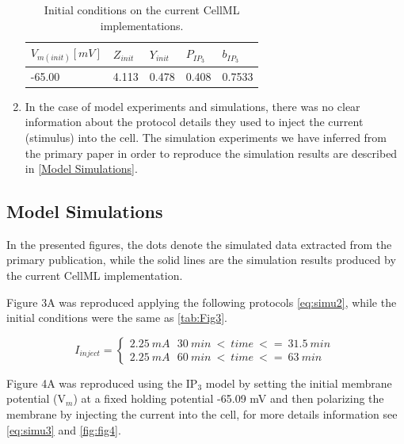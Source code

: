 \documentclass[fleqn,10pt]{physiome}
\begin{document}
\begin{enumerate}
\begin{table}[hbt!]

\centering
\begin{tabular}{lllll}\hline

$V_{m(init)}[mV]$ & $Z_{init}$ & $Y_{init}$ & $P_{IP_{3}}$ & $b_{IP_{3}}$\\ \hline
-65.00 & 4.113 & 0.478 & 0.408 & 0.7533\\
\end{tabular}\caption{Initial conditions on the current CellML implementations. }\label{tab:Fig3}
\end{table}

\item  In the case of model experiments and simulations, there was no clear information about the protocol details they used to inject the current (stimulus) into the cell. The simulation experiments we have inferred from the primary paper in order to reproduce the simulation results are described in \autoref{Model Simulations}. 

\end{enumerate}

\subsection{Model Simulations}
\label{Model Simulations}
In the presented figures, the dots denote the simulated data extracted from the primary publication, while the solid lines are the simulation results produced by the current CellML implementation.


Figure 3A was reproduced applying the following protocols \autoref{eq:simu2}, while the initial conditions were the same as \autoref{tab:Fig3}.


\begin{equation}
  I_{inject} =
 \begin{cases}
 2.25\ mA  \  \ \   30\ min\ < \ time \ <= \ 31.5\ min\  \\
 2.25\ mA  \  \ \   60\ min\ < \ time \ <= \ 63\ min\ 
 \label{eq:simu2}

  \end{cases}
\end{equation}

Figure 4A was reproduced using the IP$_{3}$ model by setting the initial membrane potential (V$_{m}$) at a fixed holding potential -65.09 mV and then polarizing the membrane by injecting the current into the cell, for more details information see \autoref{eq:simu3} and \autoref{fig:fig4}. 
\end{document}
